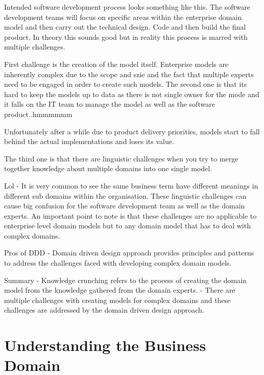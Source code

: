 \documentclass[a4paper, 11pt]{book}
\begin{document}
    Intended software development process looks something like this.
    The software development teams will focus on specific areas within the enterprise domain model and then carry out the technical design.
    Code and then build the final product.
    In theory this sounds good but in reality this process is marred with multiple challenges.

    First challenge is the creation of the model itself.
    Enterprise models are inherently complex due to the scope and szie and the fact that multiple experts need to be engaged in order to create such models.
    The second one is that its hard to keep the models up to data as there is not single owner for the mode and it falls on the IT team to manage the model as well as the software product..hmmmmmm

    Unfortunately after a while due to product delivery priorities, models start to fall behind the actual implementations and loses its value.

    The third one is that there are linguistic challenges when you try to merge together knowledge about multiple domains into one single model.

    Lol - It is very common to see the same business term have different meanings in different sub domains within the organisation.
    These linguistic challenges can cause big confusion for the software development team as well as the domain experts.
    An important point to note is that these challenges are no applicable to enterprise level domain models but to any domain model that has to deal with complex domains.

    Pros of DDD
    - Domain driven design approach provides principles and patterns to address the challenges faced with developing complex domain models.

    Summary
    - Knowledge crunching refers to the process of creating the domain model from the knowledge gathered from the domain experts.
    - There are multiple challenges with creating models for complex domains and these challenges are addressed by the domain driven design approach.


    \chapter{Understanding the Business Domain}
\end{document}
